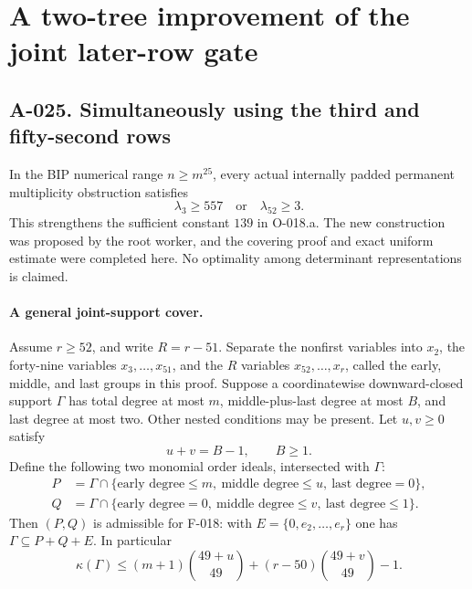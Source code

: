 \section{A two-tree improvement of the joint later-row gate}

\subsection*{A-025. Simultaneously using the third and fifty-second rows}
In the BIP numerical range $n\geq m^{25}$, every actual
internally padded permanent multiplicity obstruction satisfies
\[
                   \boxed{\quad\lambda_3\geq557
                                  \quad\text{or}\quad\lambda_{52}\geq3.\quad}
                                                         \tag{A-025.1}
\]
This strengthens the sufficient constant $139$ in O-018.a.
The new construction was proposed by the root worker, and
the covering proof and exact uniform estimate were completed
here. No optimality among determinant representations is claimed.

\paragraph{A general joint-support cover.}
Assume $r\geq52$, and write $R=r-51$. Separate the
nonfirst variables into $x_2$, the forty-nine variables
$x_3,\ldots,x_{51}$, and the $R$ variables
$x_{52},\ldots,x_r$, called the early, middle, and last
groups in this proof. Suppose a coordinatewise downward-closed
support $\Gamma$ has total degree at most $m$, middle-plus-last
degree at most $B$, and last degree at most two. Other nested
conditions may be present. Let $u,v\geq0$ satisfy
\[
                              u+v=B-1,\qquad B\geq1.
\]
Define the following two monomial order ideals, intersected
with $\Gamma$:
\[
 \begin{split}
 P&=\Gamma\cap\{\text{early degree}\leq m,
                     \ \text{middle degree}\leq u,
                     \ \text{last degree}=0\},\\
 Q&=\Gamma\cap\{\text{early degree}=0,
                     \ \text{middle degree}\leq v,
                     \ \text{last degree}\leq1\}.
 \end{split}                                           \tag{A-025.2}
\]
Then $(P,Q)$ is admissible for F-018: with
$E=\{0,e_2,\ldots,e_r\}$ one has $\Gamma\subseteq P+Q+E$.
In particular
\[
 \kappa(\Gamma)\leq
       (m+1)\binom{49+u}{49}
          +(r-50)\binom{49+v}{49}-1.                  \tag{A-025.3}
\]

